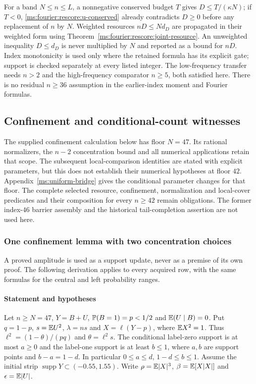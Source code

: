 For a band $N\le n\le L$, a nonnegative conserved budget $T$ gives
$D\le T/(\kappa N)$; if $T<0$, \eqref{ms:fourier:rescore:u-conserved} already
contradicts $D\ge0$ before any replacement of $n$ by $N$.
Weighted resources $nD\le N d_D$ are propagated in their weighted
form using Theorem~\ref{ms:fourier:rescore:joint-resource}.
An unweighted inequality $D\le d_D$ is never multiplied by $N$ and
reported as a bound for $nD$.
Index monotonicity is used only where the retained formula has its
explicit gate; support is checked separately at every listed integer.
The low-frequency transfer needs $n>2$ and the high-frequency comparator
$n\ge5$, both satisfied here. There is no residual $n\ge36$
assumption in the earlier-index moment and Fourier formulas.

\subsection{Confinement and conditional-count witnesses}
\label{ms:fourier:local}

\begin{remark}\label{ms:fourier:scope47}
The supplied confinement calculation below has floor $N=47$. Its rational
normalizers, the $n-2$ concentration bound and all numerical applications
retain that scope. The subsequent local-comparison identities are stated
with explicit parameters, but this does not establish their numerical
hypotheses at floor $42$. Appendix~\ref{ms:uniform-bridge} gives the
conditional parameter changes for that floor. The complete selected
resource, confinement, normalization and local-cover predicates and their
composition for every $n\ge42$ remain obligations. The former index-$46$ barrier assembly
and the historical tail-completion assertion are not used here.
\end{remark}

\subsubsection{One confinement lemma with two concentration choices}\label{ms:fourier:cut49:conf:re:confinement}
A proved amplitude is used as a support update, never as a premise of
its own proof. The following derivation applies to every acquired row,
with the same formulas for the central and left probability ranges.
\paragraph{Statement and hypotheses}
Let $n\ge N=47$, $Y=B+U$, $\mathbb P(B=1)=p<1/2$ and $\mathbb E(U\mid B)=0$.
Put $q=1-p$, $s=\mathbb E U^2$, $\lambda=ns$ and $X=\ell(Y-p)$, where
$\mathbb E X^2=1$. Thus $\ell^2=(1-\theta)/(pq)$ and $\theta=\ell^2s$.
The conditional label-zero support is at most $a\ge0$ and the label-one
support is at least $b\le1$, where $a,b$ are support points and
$b-a=1-d$. In particular $0\le a\le d$, $1-d\le b\le1$.
Assume the initial strip $\operatorname{supp}Y\subset(-0.55,1.55)$.
Write $\rho=\mathbb E|X|^3$, $\beta=\mathbb E[X|X|]$ and $\epsilon=\mathbb E|U|$.

